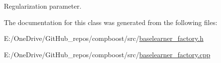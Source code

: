 Regularization parameter. 



The documentation for this class was generated from the following files\+:\begin{DoxyCompactItemize}
\item 
E\+:/\+One\+Drive/\+Git\+Hub\+\_\+repos/compboost/src/\mbox{\hyperlink{baselearner__factory_8h}{baselearner\+\_\+factory.\+h}}\item 
E\+:/\+One\+Drive/\+Git\+Hub\+\_\+repos/compboost/src/\mbox{\hyperlink{baselearner__factory_8cpp}{baselearner\+\_\+factory.\+cpp}}\end{DoxyCompactItemize}
